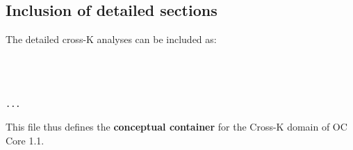 \subsection{Inclusion of detailed sections}
\noindent The detailed cross-K analyses can be included as:
\begin{verbatim}



...

\end{verbatim}

\noindent This file thus defines the \textbf{conceptual container} for the
Cross-K domain of OC Core 1.1.
